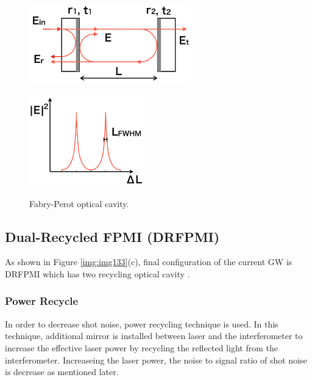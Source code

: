 \begin{figure}[h]
  \begin{minipage}[b]{0.5\hsize}
    \begin{center}   
      \includegraphics[width=7cm]{./img_chap1/img133a.png}
       \label{img:img133a}
    \end{center}
  \end{minipage}\hspace{3pt}
  \begin{minipage}[b]{0.5\hsize}
    \begin{center}   
      \includegraphics[width=5cm]{./img_chap1/img133b.png}
       \label{img:img133b}
    \end{center}    
  \end{minipage}
  \caption{Fabry-Perot optical cavity.}
\end{figure}


\subsection{Dual-Recycled FPMI (DRFPMI)}
As shown in Figure \ref{img:img133}(c), final configuration of the current GW is DRFPMI which has two recycling optical cavity \cite{meers1988recycling}.

\subsubsection{Power Recycle}
In order to decrease shot noise, power recycling technique is used. In this technique, additional mirror is installed between laser and the interferometer to increase the effective laser power by recycling the reflected light from the interferometer. Increaseing the laser power, the noise to signal ratio of shot noise is decrease as mentioned later.

